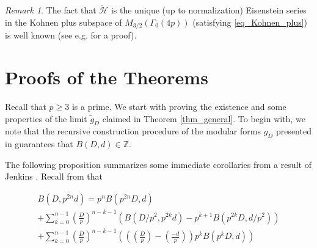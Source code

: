 \documentclass[11pt,letterpaper]{amsart}
\newcommand{\Z}{{\mathbb Z}}
\newcommand{\cH}{{\mathcal H}}
\theoremstyle{remark}
\newtheorem*{rem}{Remark}
\begin{document}
\begin{rem}

The fact that $\tilde{\cH}$ is the unique (up to normalization) Eisenstein series in the Kohnen plus subspace of $M_{3/2}(\Gamma_0(4p))$ (satisfying \eqref{eq_Kohnen_plus}) is well known (see  e.g. \cite[Theorem 1(I)]{Wang_Pei} for a proof).

\end{rem}





\section{Proofs of the Theorems}  \label {sec_conv_rate}

Recall that $p \geq 3$ is a prime. 
We start with proving the existence and some properties of the limit $\tilde{g}_D$ claimed in Theorem \ref{thm_general}. To begin with, we note that the recursive construction procedure of the modular forms $g_D$ presented in \cite{Zagier_traces} guarantees that $B(D,d) \in \Z$. 

The following proposition summarizes some immediate corollaries from a result of Jenkins \cite{Jenkins}. Recall from \cite[Theorem 1.1]{Jenkins} that 

\begin{multline} \label{eq_jenkins}
B(D, p^{2n}d) = p^nB(p^{2n} D,d) \\
+ \sum_{k=0}^{n-1} \left( \frac{D}{p} \right)^{n-k-1} \left( B(D/p^2, p{^{2k}}d) - p^{k+1}B(p^{2k}D  , d/p^2)  \right) \\ 
+  \sum_{k=0}^{n-1} \left( \frac{D}{p} \right)^{n-k-1}  \left( \left( \left( \frac{D}{p} \right) - \left( \frac{-d}{p} \right) \right) p^k B(p^kD,d) \right)
\end{multline}
\end{document}
